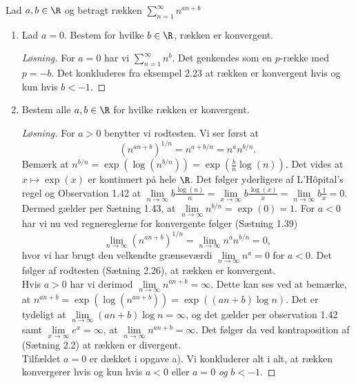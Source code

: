 \begin{opg}
	Lad $ a,b\in\R $ og betragt rækken $ \sum_{n=1}^{\infty}n^{an+b} $
	\begin{enumerate}
		\item Lad $ a=0 $. Bestem for hvilke $ b\in\R $, rækken er konvergent.
		\ifanswers
		\begin{proof}[Løsning]
			For $ a=0 $ har vi $ \sum_{n=1}^{\infty}n^b $. Det genkendes som en $ p $-række med $ p=-b $. Det konkluderes fra eksempel 2.23 at rækken er konvergent hvis og kun hvis $ b<-1 $.
		\end{proof}
		\fi
		\item Bestem alle $ a,b\in\R $ for hvilke rækken er konvergent.
		\ifanswers
		\begin{proof}[Løsning]
			For $ a> 0 $ benytter vi rodtesten. Vi ser først at \begin{equation*}
			\left(n^{an+b}\right)^{1/n}=n^{a+b/n}=n^an^{b/n}.
			\end{equation*}
			Bemærk at $n^{b/n}=\exp(\log(n^{b/n}))=\exp\left(\frac{b}{n}\log(n)\right) $. Det vides at $ x\mapsto\exp(x) $ er kontinuert på hele $ \R $. Det følger yderligere af L'H\^opital's regel og Observation 1.42 at $ \lim\limits_{n\to\infty}b\frac{\log(n)}{n}=\lim\limits_{x\to\infty}b\frac{\log(x)}{x}=\lim\limits_{n\to\infty}b\frac{1}{x}=0 $. Dermed gælder per Sætning 1.43, at $ \lim\limits_{n\to\infty}n^{b/n}=\exp(0)=1 $. For $ a<0 $ har vi nu ved regnereglerne for konvergente følger (Sætning 1.39) \begin{equation*}
			\lim\limits_{n\to\infty}\left(n^{an+b}\right)^{1/n}=\lim\limits_{n\to\infty}n^an^{b/n}=0,
			\end{equation*}
			hvor vi har brugt den velkendte grænseværdi $ \lim\limits_{n\to\infty}n^a=0 $ for $ a<0 $. Det følger af rodtesten (Sætning 2.26), at rækken er konvergent.\\
			Hvis $ a>0 $ har vi derimod $ \lim\limits_{n\to\infty}n^{an+b}=\infty $. Dette kan ses ved at bemærke, at $ n^{an+b}=\exp(\log(n^{an+b}))=\exp((an+b)\log n) $. Det er tydeligt at $ \lim\limits_{n\to\infty}(an+b)\log n=\infty $, og det gælder per observation 1.42 samt $ \lim\limits_{x\to\infty}e^x=\infty $, at $ \lim\limits_{n\to\infty}n^{an+b}=\infty $. Det følger da ved kontraposition af (Sætning 2.2) at rækken er divergent.\\
			Tilfældet $ a=0 $ er dækket i opgave a). Vi konkluderer alt i alt, at rækken konvergerer hvis og kun hvis $ a<0 $ eller $ a=0 $ \emph{og} $ b<-1 $.
		\end{proof}
		\fi
	\end{enumerate}
\end{opg}

